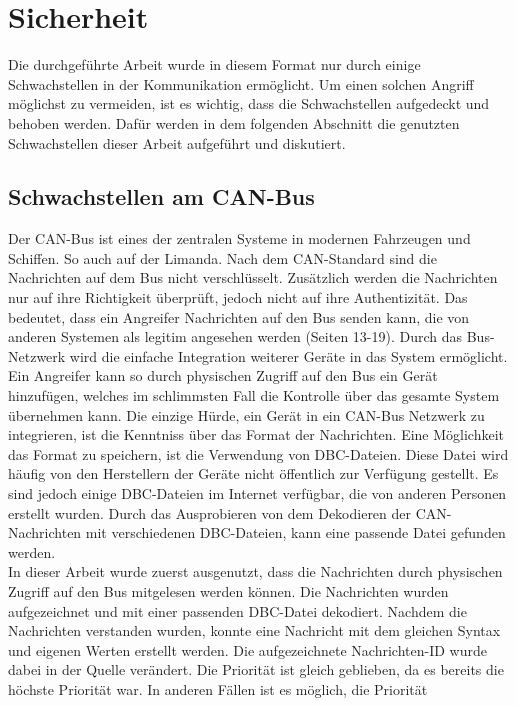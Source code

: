 \chapter{Sicherheit}

Die durchgeführte Arbeit wurde in diesem Format nur durch einige Schwachstellen in der Kommunikation ermöglicht.
Um einen solchen Angriff möglichst zu vermeiden, ist es wichtig, dass die Schwachstellen aufgedeckt und behoben werden.
Dafür werden in dem folgenden Abschnitt die genutzten Schwachstellen dieser Arbeit aufgeführt und diskutiert.

\section{Schwachstellen am CAN-Bus} \label{sec:canBusVulnerabilities}
Der CAN-Bus ist eines der zentralen Systeme in modernen Fahrzeugen und Schiffen. So auch auf der Limanda.
Nach dem CAN-Standard sind die Nachrichten auf dem Bus nicht verschlüsselt. Zusätzlich werden die Nachrichten nur 
auf ihre Richtigkeit überprüft, jedoch nicht auf ihre Authentizität. Das bedeutet, dass ein Angreifer Nachrichten auf den Bus
senden kann, die von anderen Systemen als legitim angesehen werden \cite{Voss2008} (Seiten 13-19). Durch das Bus-Netzwerk wird die einfache Integration
weiterer
Geräte in das System ermöglicht. Ein Angreifer kann so durch physischen Zugriff auf den Bus ein Gerät hinzufügen, welches im schlimmsten Fall
die Kontrolle über das gesamte System übernehmen kann. Die einzige Hürde, ein Gerät in ein CAN-Bus Netzwerk zu integrieren, ist die
Kenntniss über das Format der Nachrichten. Eine Möglichkeit das Format zu speichern, ist die Verwendung von DBC-Dateien.
Diese Datei wird häufig von den Herstellern der Geräte nicht öffentlich zur Verfügung gestellt.
Es sind jedoch einige DBC-Dateien im Internet verfügbar, die von anderen Personen erstellt wurden. Durch das Ausprobieren von dem Dekodieren
der CAN-Nachrichten mit verschiedenen DBC-Dateien, kann eine passende Datei gefunden werden. \\
In dieser Arbeit wurde zuerst ausgenutzt, dass die Nachrichten durch physischen Zugriff auf den Bus mitgelesen werden können.
Die Nachrichten wurden aufgezeichnet und mit einer passenden DBC-Datei dekodiert. Nachdem die Nachrichten verstanden wurden, konnte
eine Nachricht mit dem gleichen Syntax und eigenen Werten erstellt werden. Die aufgezeichnete Nachrichten-ID wurde dabei in der Quelle 
verändert. Die Priorität ist gleich geblieben, da es bereits die höchste Priorität war. In anderen Fällen ist es möglich, die Priorität
